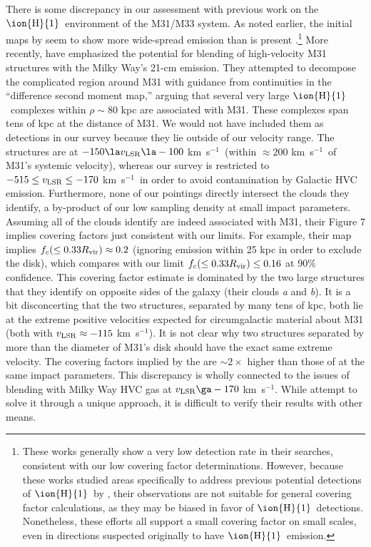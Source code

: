 \documentclass[12pt,preprint]{aastex6}
\newcommand{\HI}{\ensuremath{\mbox{\ion{H}{1}}}}
\newcommand{\Rvir}{\ensuremath{R_{\rm vir}}\relax}
\newcommand{\kms}{km~s$^{-1}$}
\newcommand{\vlsr}{\ensuremath{v_{\rm LSR}\relax}}
\begin{document}
There is some discrepancy in our assessment with previous work on the
\HI\ environment of the M31/M33 system. As noted earlier, the initial
maps by \citet{braun2004} seem to show more wide-spread emission than
is present \citep{lockman2012, wolfe2013, wolfe2016}.\footnote{These
  works generally show a very low detection rate in their searches,
  consistent with our low covering factor determinations. However,
  because these works studied areas specifically to address previous
  potential detections of \HI\ by \citet{braun2004}, their
  observations are not suitable for general covering factor
  calculations, as they may be biased in favor of \HI\
  detections. Nonetheless, these efforts all support a small covering
  factor on small scales, even in directions suspected originally to
  have \HI\ emission.} More recently, \citet{kerp2016} have emphasized
the potential for blending of high-velocity M31 structures with the
Milky Way's 21-cm emission. They attempted to decompose the
complicated region around M31 with guidance from continuities in the
``difference second moment map,'' arguing that several very large \HI\
complexes within $\rho \sim 80$ kpc are associated with M31. These
complexes span tens of kpc at the distance of M31. We would not have
included them as detections in our survey because they lie outside of
our velocity range. The \citeauthor{kerp2016} structures are at
$-150 \la \vlsr \la -100$ \kms\ (within $\approx200$ \kms\ of M31's
systemic velocity), whereas our survey is restricted to
$-515 \le \vlsr \le -170$ \kms\ in order to avoid contamination by
Galactic HVC emission. Furthermore, none of our pointings directly
intersect the clouds they identify, a by-product of our low sampling
density at small impact parameters. Assuming all of the clouds
\citeauthor{kerp2016} identify are indeed associated with M31, their
Figure 7 implies covering factors just consistent with our limits. For
example, their map implies $f_c(\le 0.33 \Rvir) \approx 0.2$ (ignoring
emission within 25 kpc in order to exclude the disk), which compares
with our limit $f_c(\le 0.33 \Rvir) \le 0.16$ at 90\% confidence. This
covering factor estimate is dominated by the two large structures that
they identify on opposite sides of the galaxy (their clouds {\em a}
and {\em b}). It is a bit disconcerting that the two structures,
separated by many tens of kpc, both lie at the extreme positive
velocities expected for circumgalactic material about M31 (both with
$\vlsr \approx -115$ \kms). It is not clear why two structures
separated by more than the diameter of M31's disk should have the
exact same extreme velocity. The covering factors implied by the
\citet{kerp2016} are $\sim2\times$ higher than those of
\citet{richter2012} at the same impact parameters. This discrepancy is
wholly connected to the issues of blending with Milky Way HVC gas at
$\vlsr \ga -170$ \kms. While \citeauthor{kerp2016} attempt to solve it
through a unique approach, it is difficult to verify their results
with other means.
\end{document}
